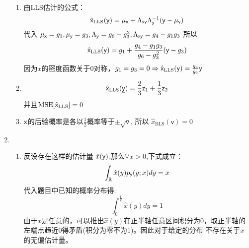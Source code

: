 \documentclass[a4paper]{article}
\begin{document}
\begin{enumerate}[label=\thehwcnt.\arabic*.]
\begin{enumerate}[label=(\alph*)]
  \item
  由LLS估计的公式：
  \[
   \hat{\mathsf{x}}_{\textrm{LLS}}(\mathsf{y})=\mu_{\mathsf{x}} + \Lambda_{\mathsf{x}\mathsf{y}}\Lambda^{-1}_{\mathsf{y}}(\mathsf{y}-\mu_{\mathsf{y}})
  \]
  代入   $\mu_{\mathsf{x}}=g_1, \mu_{\mathsf{y}}=g_3,\Lambda_{\mathsf{y}}=g_6-g_3^2,\Lambda_{\mathsf{x}\mathsf{y}}=g_4-g_1g_3$
  所以
  \[
  \hat{\mathsf{x}}_{\textrm{LLS}}(\mathsf{y}) = g_1+\frac{g_4-g_1g_3}{g_6-g_3^2}(\mathsf{y}-g_3)
  \]
  因为$x$的密度函数关于$0$对称，$g_1=g_3=0\Rightarrow \hat{\mathsf{x}}_{\textrm{LLS}}(\mathsf{y}) = \frac{g_4}{g_6}\mathsf{y}$
  \item 
  \[
   \hat{\mathsf{x}}_{\textrm{LLS}}(\underline{\mathsf{y}})=\frac{2}{3} \mathsf{z}_1 + \frac{1}{3} \mathsf{z}_2
  \]
   并且$\operatorname{MSE}[\hat{\mathsf{x}}_{\textrm{LLS}}]=0$
  \item $\mathsf{x}$的后验概率是各以$\frac{1}{2}$概率等于$\pm \sqrt{\mathsf{v}}$,
  所以 $\hat{x}_{\textrm{BLS}}(\mathsf{v})=0$
  \end{enumerate} 
  \item
  \begin{enumerate}[label=(\alph*)]
  \item 反设存在这样的估计量 $\hat{x}(\mathsf{y})$,那么$\forall x>0$,下式成立：
  \[
  \int_{\mathbb{R}}\hat{x}(y)p_{\mathsf{y}}(y;x)dy=x
  \]
  代入题目中已知的概率分布得:
  \[
  \int_0^{\frac{1}{x}} \hat{x}(y)dy = 1 
  \]
  由于$x$是任意的，可以推出$\hat{x}(y)$在正半轴任意区间积分为0，取正半轴的左端点趋近0得矛盾(积分为零不为1)。因此对于给定的分布
  不存在关于$x$的无偏估计量。


\end{enumerate}
\end{enumerate}
\end{document}
